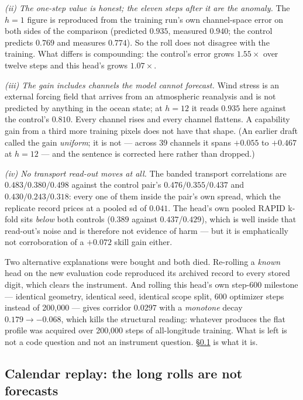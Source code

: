 \documentclass[10pt]{article}
\begin{document}
\emph{(ii) The one-step value is honest; the eleven steps after it are the
anomaly.} The $h=1$ figure is reproduced from the training run's own
channel-space error on both sides of the comparison (predicted $0.935$,
measured $0.940$; the control predicts $0.769$ and measures $0.774$). So the
roll does not disagree with the training. What differs is compounding: the
control's error grows $1.55\times$ over twelve steps and this head's grows
$1.07\times$.

\emph{(iii) The gain includes channels the model cannot forecast.} Wind
stress is an external forcing field that arrives from an atmospheric
reanalysis and is not predicted by anything in the ocean state; at $h=12$ it
reads $0.935$ here against the control's $0.810$. Every channel rises and
every channel flattens. A capability gain from a third more training pixels
does not have that shape. (An earlier draft called the gain \emph{uniform};
it is not --- across 39 channels it spans $+0.055$ to $+0.467$ at $h=12$ ---
and the sentence is corrected here rather than dropped.)

\emph{(iv) No transport read-out moves at all.} The banded transport
correlations are $0.483/0.380/0.498$ against the control pair's
$0.476/0.355/0.437$ and $0.430/0.243/0.318$: every one of them inside the
pair's own spread, which the replicate record prices at a pooled sd of
$0.041$. The head's own pooled RAPID k-fold sits \emph{below} both controls
($0.389$ against $0.437$/$0.429$), which is well inside that read-out's
noise and is therefore not evidence of harm --- but it is emphatically not
corroboration of a $+0.072$ skill gain either.

Two alternative explanations were bought and both died. Re-rolling a
\emph{known} head on the new evaluation code reproduced its archived record
to every stored digit, which clears the instrument. And rolling this head's
own step-600 milestone --- identical geometry, identical seed, identical
scope split, 600 optimizer steps instead of 200{,}000 --- gives corridor
$0.0297$ with a \emph{monotone} decay $0.179 \to -0.068$, which kills the
structural reading: whatever produces the flat profile was acquired over
200{,}000 steps of all-longitude training. What is left is not a code
question and not an instrument question. \S\ref{sec:replay} is what it is.

\subsection{Calendar replay: the long rolls are not
forecasts}\label{sec:replay}
\end{document}

